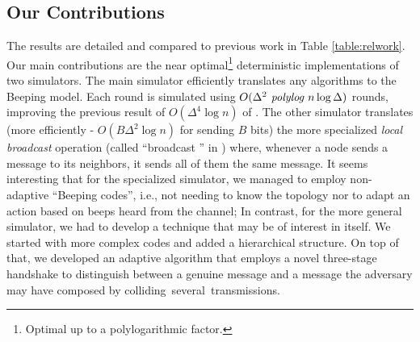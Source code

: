 \subsection{Our Contributions}




\vspace*{-0.2ex}
The results are detailed and compared to previous work in Table \ref{table:relwork}.
Our main contributions are the near optimal\footnote{Optimal up to a polylogarithmic factor.} deterministic implementations of two simulators.
The main simulator efficiently translates any \congest algorithms  to the Beeping model.
Each \congest round is simulated using $O(\Delta ^2 \text{\em\ polylog } n \log \Delta )$ rounds, improving the previous result of $O(\Delta^4 \log n)$ of \cite{beauquier2018fast}.
The other simulator translates (more efficiently -
$O(B\Delta^2 \log n)$ for sending $B$ bits)
the more specialized
\emph{local broadcast} operation 
(called ``broadcast \congest'' in \cite{davies2023optimal}) 
where, whenever a node sends a message to its neighbors, it sends all of them the same message. It seems interesting that for the specialized simulator, we managed to employ non-adaptive ``Beeping codes'', 
i.e.,
not needing to know the topology nor to adapt an action based on beeps heard from the channel;  
In contrast, for the more general simulator, we had to develop a technique that may be of interest in itself. We started with more complex codes and added a hierarchical structure. On top of that, we developed an adaptive algorithm that employs a novel three-stage handshake to distinguish between a genuine message and a message the adversary may have composed by colliding~several~transmissions.
  
